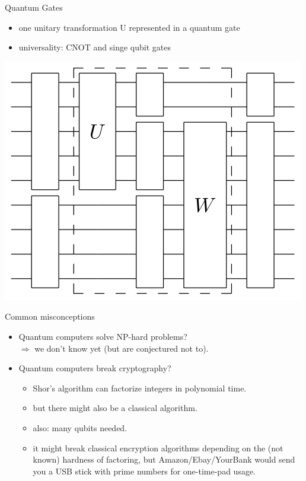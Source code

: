 \documentclass[c]{beamer}
\begin{document}
\begin{frame}{Quantum Gates}
\begin{itemize}
\item one unitary transformation U represented in a quantum gate
\item universality: CNOT and singe qubit gates
\end{itemize}
\begin{center}
\includegraphics[scale=0.3]{images/circuit.png} 
\end{center}

\end{frame}


\begin{frame}{Common misconceptions}
\begin{itemize}
\item Quantum computers solve NP-hard problems? \\
$\Rightarrow$ we don't know yet (but are conjectured not to).
\item Quantum computers break cryptography? \\
\begin{itemize}
\item Shor's algorithm can factorize integers in polynomial time.
\item but there might also be a classical algorithm.
\item also: many qubits needed.
\item it might break classical encryption algorithms depending on the (not known) hardness of factoring, but Amazon/Ebay/YourBank would send you a USB stick with prime numbers for one-time-pad usage.
\end{itemize}
\end{itemize}
\end{frame}
\end{document}
